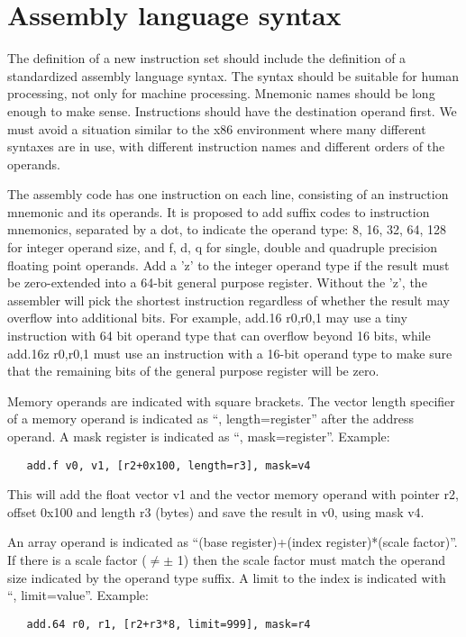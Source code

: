 \documentclass[forwardcom.tex]{subfiles}
\begin{document}
\RaggedRight


\section{Assembly language syntax} \label{assemblySyntax}
The definition of a new instruction set should include the definition of a standardized assembly language syntax. The syntax should be suitable for human processing, not only for machine processing. Mnemonic names should be long enough to make sense. Instructions should have the destination operand first. We must avoid a situation similar to the x86 environment where many different syntaxes are in use, with different instruction names and different orders of the operands. 
\vspace{2mm}

The assembly code has one instruction on each line, consisting of an instruction mnemonic and its operands. 
It is proposed to add suffix codes to instruction mnemonics, separated by a dot, to indicate the operand type: 8, 16, 32, 64, 128 for integer operand size, and f, d, q for single, double and quadruple precision floating point operands. Add a 'z' to the integer operand type if the result must be zero-extended into a 64-bit general purpose register. Without the 'z', the assembler will pick the shortest instruction regardless of whether the result may overflow into additional bits. For example, add.16 r0,r0,1 may use a tiny instruction with 64 bit operand type that can overflow beyond 16 bits, while add.16z r0,r0,1 must use an instruction with a 16-bit operand type to make sure that the remaining bits of the general purpose register will be zero. 
\vspace{2mm}

Memory operands are indicated with square brackets. The vector length specifier of a memory operand is indicated as ``, length=register'' after the address operand. A mask register is indicated as ``, mask=register''. Example: 
\begin{lstlisting}
   add.f v0, v1, [r2+0x100, length=r3], mask=v4
\end{lstlisting}

This will add the float vector v1 and the vector memory operand with pointer r2, offset 0x100 and length r3 (bytes) and save the result in v0, using mask v4. 
\vspace{2mm}

An array operand is indicated as ``(base register)+(index register)*(scale factor)''. If there is a scale factor ($\neq \pm$ 1) then the scale factor must match the operand size indicated by the operand type suffix. A limit to the index is indicated with \\
``, limit=value''. Example:
\begin{lstlisting}
   add.64 r0, r1, [r2+r3*8, limit=999], mask=r4
\end{lstlisting}
\end{document}
